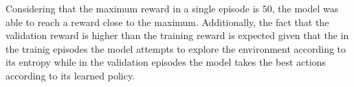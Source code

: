 Considering that the maximum reward in a single episode is $50$, the model was able to reach a reward close to the maximum. Additionally, the fact that the validation reward is higher than the training reward is expected given that the in the trainig episodes the model attempts to explore the environment according to its entropy while in the validation episodes the model takes the best actions according to its learned policy.

